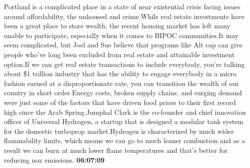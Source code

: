 \documentclass{article}%
\begin{document}
Portland is a complicated place in a state of near existential crisis facing issues around affordability, the unhoused and crime.While real estate investments have been a great place to store wealth, the recent housing market has left many unable to participate, especially when it comes to BIPOC communities.It may seem complicated, but Joel and Sue believe that programs like Alt cap can give people who've long been excluded from real estate and attainable investment option.If we can get real estate transactions to include everybody, you're talking about \$1 trillion industry that has the ability to engage everybody in a micro fashion earned at a disproportionate rate, you can transition the wealth of our country in short order.Energy costs, broken supply chains, and surging demand were just some of the factors that have driven food prices to their first record high since the Arab Spring.Jumphal Clark is the co{-}founder and chief innovation officer of Universal Hydrogen, a startup that is designed a modular tank system for the domestic turboprop market.Hydrogen is characterized by much wider flammability limits, which means we can go to much leaner combustion and as a result we can burn at much lower flame temperatures and that's better for reducing nox emissions.%
\textbf{06:07:09}%
\newline%
\end{document}
